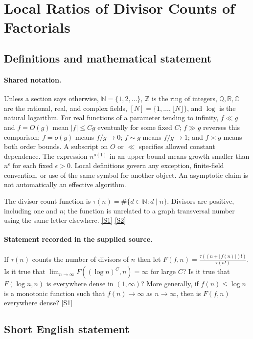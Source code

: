 \documentclass[11pt,a4paper]{article}
\newcommand{\N}{\mathbb{N}}
\newcommand{\Z}{\mathbb{Z}}
\newcommand{\Q}{\mathbb{Q}}
\newcommand{\R}{\mathbb{R}}
\newcommand{\C}{\mathbb{C}}
\newcommand{\sref}[2]{\hyperlink{source:#1:#2}{[S#2]}}
\begin{document}
\section{Local Ratios of Divisor Counts of Factorials}\label{statement}


\subsection{Definitions and mathematical statement}

\paragraph{Shared notation.}Unless a section says otherwise, $\N=\{1,2,\ldots\}$,
$\Z$ is the ring of integers, $\Q,\R,\C$ are the rational, real, and complex
fields, $[N]=\{1,\ldots,\lfloor N\rfloor\}$, and $\log$ is the natural
logarithm. For real functions of a parameter tending to infinity,
$f\ll g$ and $f=O(g)$ mean $|f|\leq Cg$ eventually for some fixed $C$;
$f\gg g$ reverses this comparison; $f=o(g)$ means $f/g\to0$;
$f\sim g$ means $f/g\to1$; and $f\asymp g$ means both order bounds.
A subscript on $O$ or $\ll$ specifies allowed constant dependence.
The expression $n^{o(1)}$ in an upper bound means growth smaller than
$n^\epsilon$ for each fixed $\epsilon>0$. Local definitions govern any
exception, finite-field convention, or use of the same symbol for another
object. An asymptotic claim is not automatically an effective algorithm.



The divisor-count function is $\tau(n)=\#\{d\in\N:d\mid n\}$. Divisors are positive, including one and $n$; the function is unrelated to a graph transversal number using the same letter elsewhere. \sref{statement}{1} \sref{statement}{2}

\paragraph{Statement recorded in the supplied source.}
If $\tau(n)$ counts the number of divisors of $n$ then let $ F(f,n)=\frac{\tau((n+\lfloor f(n)\rfloor)!)}{\tau(n!)}. $ Is it true that $ \lim_{n\to \infty}F((\log n)^C,n)=\infty $ for large $C$?
Is it true that $F(\log n,n)$ is everywhere dense in $(1,\infty)$?
More generally, if $f(n)\leq \log n$ is a monotonic function such that $f(n)\to \infty$ as $n\to \infty$, then is $F(f,n)$ everywhere dense? \sref{statement}{1}

\subsection{Short English statement}
\end{document}
